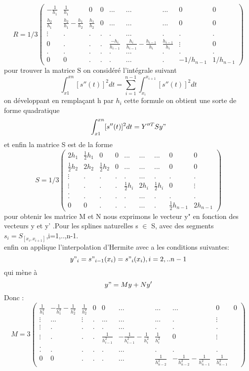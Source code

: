 \documentclass[11pt]{report}
\begin{document}
$$R=1/3\begin{pmatrix} -\frac{1}{h_1}&\frac{1}{h_1}&0&0&...&...&...&0&0 \\ \frac{h_2}{h_1}&\frac{h_2}{h_1}-\frac{h_1}{h_2}&\frac{h_1}{h_2}&0&...&...&...&0&0 \\ \vdots&.&.&.&.&...&.&.&.\\ 0&.&.&.&\frac{-h_i}{h_{i-1}}&\frac{h_i}{h_{i-1}}-\frac{h_{i-1}}{h_i}&\frac{h_{i-1}}{h_i}&\vdots&0 \\.&.&.&.&.&...&.&.&. \\ 0&0&.&.&.&...&.&-1/h_{n-1}&1/h_{n-1} \end{pmatrix}$$\newpage
pour trouver la matrice S on considéré  l'intégrale suivant \\
$$\int_{x1}^{xn}[s''(t)]^2dt=\sum_{i=1}^{n-1}\int_{x_i}^{x_{i+1}}[s''(t)]^2dt$$
on développant en remplaçant h par $h_i$   cette formule on obtient une sorte de forme quadratique  $$\int_{x1}^{xn}[s''(t)]^2dt= Y''^T S y"$$
et enfin la matrice S est de la forme 
$$S=1/3\begin{pmatrix} 2h_1&\frac{1}{2}h_1&0&0&...&...&...&0&0 \\ \frac{1}{2}h_2&2h_2&\frac{1}{2}h_2&0&...&...&...&0&0 \\ \vdots&.&.&.&.&...&.&.&.\\ \vdots&.&.&.&\frac{1}{2}h_i&2h_i&\frac{1}{2}h_i&0&\vdots \\. \\.&.&.&.&.&...&.&.&. \\ 0&0&.&.&.&...&.&\frac{1}{2}h_{n-1}&2h_{n-1} \end{pmatrix}$$
pour obtenir les matrice M et N nous exprimons le vecteur y" en fonction des  vecteurs y et y' .Pour les splines naturelles s $\in$ S, avec des segments $s_i=S_{[x_i,x_{i+1}]}$,i=1,..,n-1.\\
enfin on applique l'interpolation d'Hermite avec a les conditions suivantes:$$y"_i=s"_{i-1}(x_i)=s"_i(x_i) ,i=2,..n-1$$
qui mène à $$y"=My+Ny'$$ Donc :
$$M=3\begin{pmatrix} \frac{1}{h_1^2}&-\frac{1}{h_1^2}-\frac{1}{h_2^2}&\frac{1}{h_2^2}&0&0&...&...&...&0&0 \\ \vdots&...&\vdots&.&...&...&...&.&\vdots \\ \vdots&.&.&.&.&...&.&.&.\\ \vdots&.&.&.&\frac{1}{h_{i-1}^2}&-\frac{1}{h_{i-1}^2}-\frac{1}{h_i^2}&\frac{1}{h_i^2}&0&\vdots \\. \\.&.&.&.&.&...&.&.&. \\ 0&0&.&.&.&...&\frac{1}{h_{n-2}^2}&-\frac{1}{h_{n-2}^2}-\frac{1}{h_{n-1}^2}&\frac{1}{h_{n-1}^2} \end{pmatrix}$$
\end{document}
